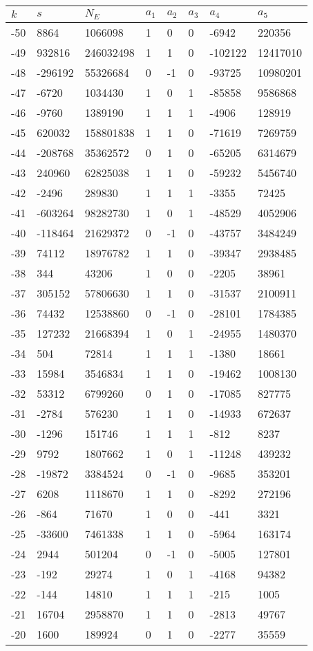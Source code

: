 \documentclass{amsart}
\begin{document}
\begin{longtable}{|l|l|l|lllll|}
\hline
$k$ & $s$ & $N_E$ & $a_1$ & $a_2$ & $a_3$ & $a_4$ & $a_5$\\
\hline
-50&8864&1066098&1&0&0&-6942&220356\\
-49&932816&246032498&1&1&0&-102122&12417010\\
-48&-296192&55326684&0&-1&0&-93725&10980201\\
-47&-6720&1034430&1&0&1&-85858&9586868\\
-46&-9760&1389190&1&1&1&-4906&128919\\
-45&620032&158801838&1&1&0&-71619&7269759\\
-44&-208768&35362572&0&1&0&-65205&6314679\\
-43&240960&62825038&1&1&0&-59232&5456740\\
-42&-2496&289830&1&1&1&-3355&72425\\
-41&-603264&98282730&1&0&1&-48529&4052906\\
-40&-118464&21629372&0&-1&0&-43757&3484249\\
-39&74112&18976782&1&1&0&-39347&2938485\\
-38&344&43206&1&0&0&-2205&38961\\
-37&305152&57806630&1&1&0&-31537&2100911\\
-36&74432&12538860&0&-1&0&-28101&1784385\\
-35&127232&21668394&1&0&1&-24955&1480370\\
-34&504&72814&1&1&1&-1380&18661\\
-33&15984&3546834&1&1&0&-19462&1008130\\
-32&53312&6799260&0&1&0&-17085&827775\\
-31&-2784&576230&1&1&0&-14933&672637\\
-30&-1296&151746&1&1&1&-812&8237\\
-29&9792&1807662&1&0&1&-11248&439232\\
-28&-19872&3384524&0&-1&0&-9685&353201\\
-27&6208&1118670&1&1&0&-8292&272196\\
-26&-864&71670&1&0&0&-441&3321\\
-25&-33600&7461338&1&1&0&-5964&163174\\
-24&2944&501204&0&-1&0&-5005&127801\\
-23&-192&29274&1&0&1&-4168&94382\\
-22&-144&14810&1&1&1&-215&1005\\
-21&16704&2958870&1&1&0&-2813&49767\\
-20&1600&189924&0&1&0&-2277&35559\\

\end{longtable}
\end{document}
